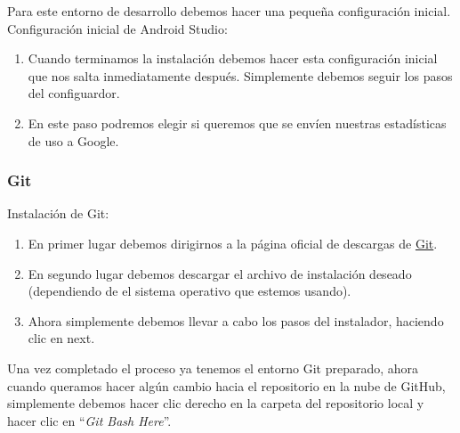 Para este entorno de desarrollo debemos hacer una pequeña configuración inicial.
Configuración inicial de Android Studio:
\begin{enumerate}
\item
	Cuando terminamos la instalación debemos hacer esta configuración inicial que nos salta inmediatamente después.
	Simplemente debemos seguir los pasos del configuardor.
\item
	En este paso podremos elegir si queremos que se envíen nuestras estadísticas de uso a Google.

\end{enumerate}

\subsubsection{Git}

Instalación de Git:

\begin{enumerate}
\item
	En primer lugar debemos dirigirnos a la página oficial de descargas de \href{https://git-scm.com/downloads}{Git}.
\item
	En segundo lugar debemos descargar el archivo de instalación deseado (dependiendo de el sistema operativo que estemos usando).
\item 
	Ahora simplemente debemos llevar a cabo los pasos del instalador, haciendo clic en next.
\end{enumerate}
Una vez completado el proceso ya tenemos el entorno Git preparado, ahora cuando queramos hacer algún cambio hacia el repositorio en la nube de GitHub, simplemente debemos hacer clic derecho en la carpeta del repositorio local y hacer clic en ``\textit{Git Bash Here}''.


